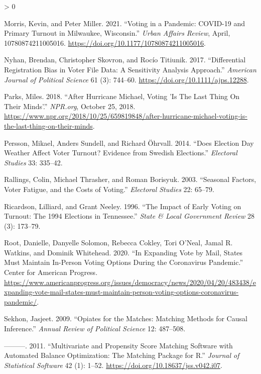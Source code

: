 \documentclass[
  12pt,
]{article}
\newlength{\cslhangindent}
\newenvironment{CSLReferences}[2] %
 {%
  \setlength{\parindent}{0pt}
  \ifodd #1 \everypar{\setlength{\hangindent}{\cslhangindent}}\ignorespaces\fi
  \ifnum #2 > 0
  \setlength{\parskip}{#2\baselineskip}
  \fi
 }%
 {}
\begin{document}
\begin{CSLReferences}{1}{0}
\leavevmode\hypertarget{ref-Morris2021}{}%
Morris, Kevin, and Peter Miller. 2021. {``Voting in a {Pandemic}: {COVID}-19 and {Primary Turnout} in {Milwaukee}, {Wisconsin}.''} \emph{Urban Affairs Review}, April, 10780874211005016. \url{https://doi.org/10.1177/10780874211005016}.

\leavevmode\hypertarget{ref-Nyhan2017}{}%
Nyhan, Brendan, Christopher Skovron, and Rocío Titiunik. 2017. {``Differential {Registration Bias} in {Voter File Data}: {A Sensitivity Analysis Approach}.''} \emph{American Journal of Political Science} 61 (3): 744--60. \url{https://doi.org/10.1111/ajps.12288}.

\leavevmode\hypertarget{ref-Parks2018}{}%
Parks, Miles. 2018. {``After {Hurricane Michael}, {Voting} '{Is The Last Thing On Their Minds}'.''} \emph{NPR.org}, October 25, 2018. \url{https://www.npr.org/2018/10/25/659819848/after-hurricane-michael-voting-is-the-last-thing-on-their-minds}.

\leavevmode\hypertarget{ref-Persson2014}{}%
Persson, Mikael, Anders Sundell, and Richard Öhrvall. 2014. {``Does {Election Day Weather Affect Voter Turnout}? {Evidence} from {Swedish Elections}.''} \emph{Electoral Studies} 33: 335--42.

\leavevmode\hypertarget{ref-Rallings2003}{}%
Rallings, Colin, Michael Thrasher, and Roman Borisyuk. 2003. {``Seasonal {Factors}, Voter Fatigue, and the Costs of Voting.''} \emph{Electoral Studies} 22: 65--79.

\leavevmode\hypertarget{ref-Ricardson1996}{}%
Ricardson, Lilliard, and Grant Neeley. 1996. {``The {Impact} of {Early Voting} on {Turnout}: {The} 1994 {Elections} in {Tennessee}.''} \emph{State \& Local Government Review} 28 (3): 173--79.

\leavevmode\hypertarget{ref-Root2020}{}%
Root, Danielle, Danyelle Solomon, Rebecca Cokley, Tori O'Neal, Jamal R. Watkins, and Dominik Whitehead. 2020. {``In {Expanding Vote} by {Mail}, {States Must Maintain In}-{Person Voting Options During} the {Coronavirus Pandemic}.''} {Center for American Progress}. \url{https://www.americanprogress.org/issues/democracy/news/2020/04/20/483438/expanding-vote-mail-states-must-maintain-person-voting-options-coronavirus-pandemic/}.

\leavevmode\hypertarget{ref-Sekhon2009}{}%
Sekhon, Jasjeet. 2009. {``Opiates for the {Matches}: {Matching Methods} for {Causal Inference}.''} \emph{Annual Review of Political Science} 12: 487--508.

\leavevmode\hypertarget{ref-Sekhon2011}{}%
---------. 2011. {``Multivariate and {Propensity Score Matching Software} with {Automated Balance Optimization}: {The Matching} Package for {R}.''} \emph{Journal of Statistical Software} 42 (1): 1--52. \url{https://doi.org/10.18637/jss.v042.i07}.


\end{CSLReferences}
\end{document}
